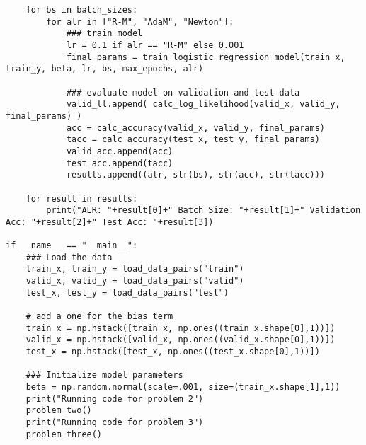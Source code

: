 \documentclass[11pt]{article}
\begin{document}
\begin{verbatim}
    for bs in batch_sizes:
        for alr in ["R-M", "AdaM", "Newton"]:
            ### train model
            lr = 0.1 if alr == "R-M" else 0.001
            final_params = train_logistic_regression_model(train_x, train_y, beta, lr, bs, max_epochs, alr)
    
            ### evaluate model on validation and test data
            valid_ll.append( calc_log_likelihood(valid_x, valid_y, final_params) )
            acc = calc_accuracy(valid_x, valid_y, final_params)
            tacc = calc_accuracy(test_x, test_y, final_params)
            valid_acc.append(acc)
            test_acc.append(tacc)
            results.append((alr, str(bs), str(acc), str(tacc)))

    for result in results:
        print("ALR: "+result[0]+" Batch Size: "+result[1]+" Validation Acc: "+result[2]+" Test Acc: "+result[3])

if __name__ == "__main__":
    ### Load the data
    train_x, train_y = load_data_pairs("train")
    valid_x, valid_y = load_data_pairs("valid")
    test_x, test_y = load_data_pairs("test")

    # add a one for the bias term                                                                                                                                                 
    train_x = np.hstack([train_x, np.ones((train_x.shape[0],1))])
    valid_x = np.hstack([valid_x, np.ones((valid_x.shape[0],1))])
    test_x = np.hstack([test_x, np.ones((test_x.shape[0],1))])

    ### Initialize model parameters
    beta = np.random.normal(scale=.001, size=(train_x.shape[1],1))
    print("Running code for problem 2")
    problem_two()
    print("Running code for problem 3")
    problem_three()
\end{verbatim}
\end{document}
